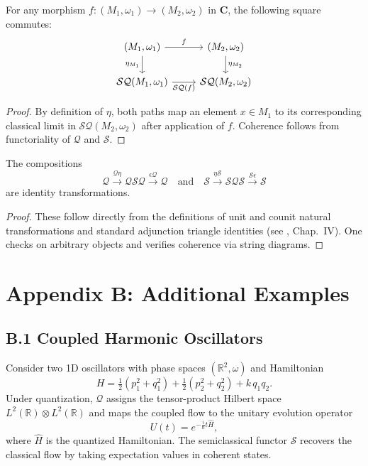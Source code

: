 \documentclass[11pt]{article}
\begin{document}
\begin{lemma}
For any morphism $f: (M_1,\omega_1) \to (M_2,\omega_2)$ in $\mathbf{C}$, the following square commutes:
\[
\begin{tikzcd}
 (M_1,\omega_1) \arrow[r, "f"] \arrow[d, "\eta_{M_1}"'] & (M_2,\omega_2) \arrow[d, "\eta_{M_2}"] \\
 \mathcal S\mathcal Q(M_1,\omega_1) \arrow[r, "\mathcal S\mathcal Q(f)"'] & \mathcal S\mathcal Q(M_2,\omega_2)
\end{tikzcd}
\]
\end{lemma}

\begin{proof}
By definition of $\eta$, both paths map an element $x\in M_1$ to its corresponding classical limit in $\mathcal S\mathcal Q(M_2,\omega_2)$ after application of $f$.  Coherence follows from functoriality of $\mathcal Q$ and $\mathcal S$.
\end{proof}

\begin{lemma}
The compositions
\[
\mathcal Q \xrightarrow{\mathcal Q\eta} \mathcal Q\mathcal S\mathcal Q \xrightarrow{\epsilon\mathcal Q} \mathcal Q
\quad\text{and}\quad
\mathcal S \xrightarrow{\eta\mathcal S} \mathcal S\mathcal Q\mathcal S \xrightarrow{\mathcal S\epsilon} \mathcal S
\]
are identity transformations.
\end{lemma}

\begin{proof}
These follow directly from the definitions of unit and counit natural transformations and standard adjunction triangle identities (see \citealp{MacLane98}, Chap.~IV).  One checks on arbitrary objects and verifies coherence via string diagrams.
\end{proof}

\newpage
\section*{Appendix B: Additional Examples}
\label{appendixB}

\subsection*{B.1 Coupled Harmonic Oscillators}
Consider two 1D oscillators with phase spaces $(\mathbb R^2,\omega)$ and Hamiltonian
\[
H = \tfrac12(p_1^2 + q_1^2) + \tfrac12(p_2^2 + q_2^2) + k\,q_1 q_2.
\]
Under quantization, $\mathcal Q$ assigns the tensor-product Hilbert space $L^2(\mathbb R)\otimes L^2(\mathbb R)$ and maps the coupled flow to the unitary evolution operator
\[
U(t) = e^{-\tfrac{i}{\hbar}t\hat H},
\]
where $\hat H$ is the quantized Hamiltonian.  The semiclassical functor $\mathcal S$ recovers the classical flow by taking expectation values in coherent states.
\end{document}
